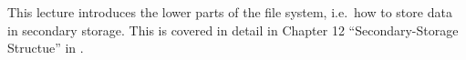 This lecture introduces the lower parts of the file system, i.e.\ how to store 
data in secondary storage.
This is covered in detail in Chapter 12 ``Secondary-Storage Structue'' in 
\cite{Silberschatz2009osc}.
